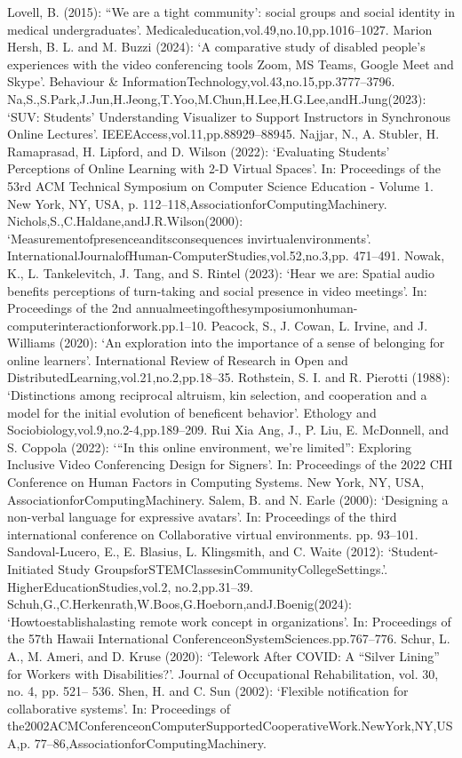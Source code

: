 \documentclass[12pt]{ctexart}
\begin{document}
Lovell, B. (2015): “We are a tight community’: social groups and social identity in medical
undergraduates’. Medicaleducation,vol.49,no.10,pp.1016–1027.
Marion Hersh, B. L. and M. Buzzi (2024): ‘A comparative study of disabled people’s experiences
with the video conferencing tools Zoom, MS Teams, Google Meet and Skype’. Behaviour \&
InformationTechnology,vol.43,no.15,pp.3777–3796.
Na,S.,S.Park,J.Jun,H.Jeong,T.Yoo,M.Chun,H.Lee,H.G.Lee,andH.Jung(2023): ‘SUV:
Students’ Understanding Visualizer to Support Instructors in Synchronous Online Lectures’.
IEEEAccess,vol.11,pp.88929–88945.
Najjar, N., A. Stubler, H. Ramaprasad, H. Lipford, and D. Wilson (2022): ‘Evaluating Students’
Perceptions of Online Learning with 2-D Virtual Spaces’. In: Proceedings of the 53rd ACM
Technical Symposium on Computer Science Education - Volume 1. New York, NY, USA, p.
112–118,AssociationforComputingMachinery.
Nichols,S.,C.Haldane,andJ.R.Wilson(2000): ‘Measurementofpresenceanditsconsequences
invirtualenvironments’. InternationalJournalofHuman-ComputerStudies,vol.52,no.3,pp.
471–491.
Nowak, K., L. Tankelevitch, J. Tang, and S. Rintel (2023): ‘Hear we are: Spatial audio benefits
perceptions of turn-taking and social presence in video meetings’. In: Proceedings of the 2nd
annualmeetingofthesymposiumonhuman-computerinteractionforwork.pp.1–10.
Peacock, S., J. Cowan, L. Irvine, and J. Williams (2020): ‘An exploration into the importance
of a sense of belonging for online learners’. International Review of Research in Open and
DistributedLearning,vol.21,no.2,pp.18–35.
Rothstein, S. I. and R. Pierotti (1988): ‘Distinctions among reciprocal altruism, kin selection,
and cooperation and a model for the initial evolution of beneficent behavior’. Ethology and
Sociobiology,vol.9,no.2-4,pp.189–209.
Rui Xia Ang, J., P. Liu, E. McDonnell, and S. Coppola (2022): ‘“In this online environment,
we’re limited”: Exploring Inclusive Video Conferencing Design for Signers’. In: Proceedings
of the 2022 CHI Conference on Human Factors in Computing Systems. New York, NY, USA,
AssociationforComputingMachinery.
Salem, B. and N. Earle (2000): ‘Designing a non-verbal language for expressive avatars’. In:
Proceedings of the third international conference on Collaborative virtual environments. pp.
93–101.
Sandoval-Lucero, E., E. Blasius, L. Klingsmith, and C. Waite (2012): ‘Student-Initiated Study
GroupsforSTEMClassesinCommunityCollegeSettings.’. HigherEducationStudies,vol.2,
no.2,pp.31–39.
Schuh,G.,C.Herkenrath,W.Boos,G.Hoeborn,andJ.Boenig(2024): ‘Howtoestablishalasting
remote work concept in organizations’. In: Proceedings of the 57th Hawaii International
ConferenceonSystemSciences.pp.767–776.
Schur, L. A., M. Ameri, and D. Kruse (2020): ‘Telework After COVID: A “Silver Lining” for
Workers with Disabilities?’. Journal of Occupational Rehabilitation, vol. 30, no. 4, pp. 521–
536.
Shen, H. and C. Sun (2002): ‘Flexible notification for collaborative systems’. In: Proceedings of
the2002ACMConferenceonComputerSupportedCooperativeWork.NewYork,NY,USA,p.
77–86,AssociationforComputingMachinery.
\end{document}
